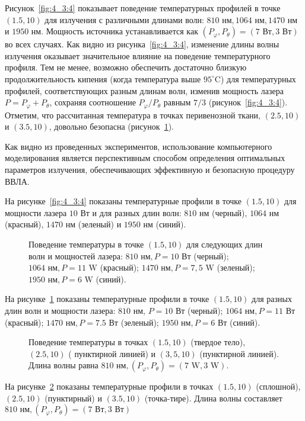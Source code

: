 Рисунок~\ref{fig:4_3:4} показывает поведение температурных профилей в точке $(1.5,10)$ для
излучения с различными длинами волн: $810 \text{~нм}, 1064 \text{~нм},
1470 \text{~нм}$ и $1950 \text{~нм}$.
Мощность источника устанавливается как $\left(P_{\varphi}, P_{\theta}\right)
=(7 \text{~Вт}, 3 \text{~Вт})$ во всех случаях.
Как видно из рисунка~\ref{fig:4_3:4}, изменение длины волны излучения оказывает
значительное влияние на поведение температурного профиля.
Тем не менее, возможно обеспечить достаточно близкую продолжительность
кипения (когда температура выше $95^{\circ} \text{C}$) для температурных
профилей, соответствующих разным длинам волн, изменив мощность
лазера $P=P_{\varphi}+P_{\theta}$, сохраняя соотношение
$P_{\varphi} / P_{\theta}$ равным $7 / 3$ (рисунок~\ref{fig:4_3:4}).
Отметим, что рассчитанная температура в точках перивенозной ткани,
$(2.5,10)$ и $(3.5,10)$, довольно безопасна (рисунок~\ref{fig:4_3:5}).

Как видно из проведенных экспериментов, использование компьютерного
моделирования является перспективным способом определения оптимальных
параметров излучения, обеспечивающих эффективную и безопасную процедуру ВВЛА.

На рисунке~\ref{fig:4_3:4} показаны температурные профили
в точке $(1.5, 10)$ для мощности лазера
$10 \text{~Вт}$ и для разных длин волн: $810 \text{~нм}$ (черный),
$1064 \text{~нм}$ (красный), $1470 \text{~нм}$
(зеленый) и $1950 \text{~нм}$ (синий).

\begin{figure}[h!t]
    \caption{Поведение температуры в точке $(1.5,10)$
        для следующих длин волн и мощностей лазера:
        $810 \text{~нм}, P=10 \text{~Вт}$ (черный);
        $1064 \text{~нм}, P=11 \text{~W}$ (красный);
        $1470 \text{~нм}, P=7,5 \text{~W}$ (зеленый);
        $1950 \text{~нм}, P=6 \text{~W}$ (синий).}
    \label{fig:4_3:5}
\end{figure}
На рисунке~\ref{fig:4_3:5} показаны температурные профили в точке $(1.5,10)$ для разных
длин волн и мощности лазера: $810 \text{~нм}$, $P=10 \text{~Вт}$
(черный); $1064 \text{~нм}, P=11 \text{~Вт}$ (красный);
$1470 \text{~нм}, P=7.5 \text{~Вт}$ (зеленый);
$1950 \text{~нм}, P=6 \text{~Вт}$ (синий).


\begin{figure}[h!t]
    \caption{Поведение температуры в точках $(1.5,10)$ (твердое тело),
        $(2.5,10)$ ( пунктирной линией) и $(3,5,10)$ (пунктирной линией).
        Длина волны равна $810 \text{~нм},\left(P_{\varphi},
        P_{\theta}\right)=(7 \text{~W}, 3 \text{~W})$.}
    \label{fig:4_3:6}
\end{figure}
На рисунке~\ref{fig:4_3:6} показаны температурные профили в точках $(1.5,10)$ (сплошной),
$(2.5,10)$ (пунктирный) и $(3.5,10)$ (точка-тире).
Длина волны составляет $810 \text{~нм},\left(P_{\varphi},
P_{\theta}\right)=(7 \text{~Вт}, 3 \text{~Вт})$


